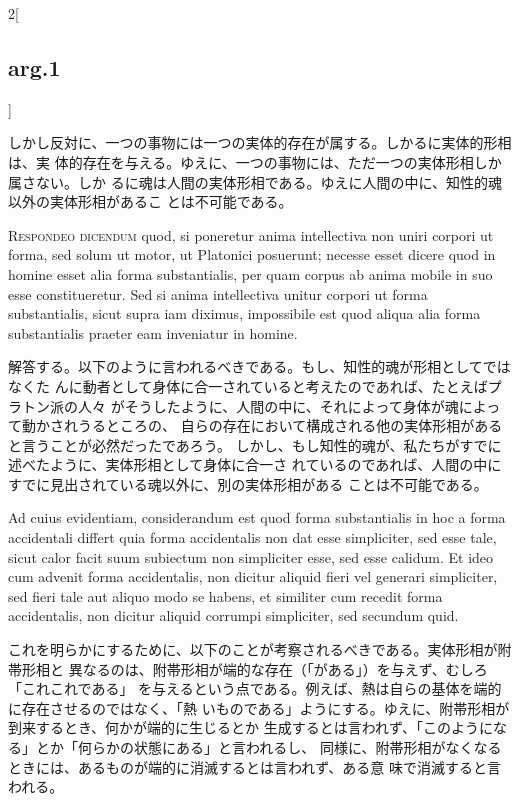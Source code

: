 \documentclass[paper=a4paper,fontsize=10pt,jafontsize=9pt,titlepage]{jlreq}
\begin{document}
\begin{paracol}{2}[\subsection{arg.1}]
\switchcolumn

 しかし反対に、一つの事物には一つの実体的存在が属する。しかるに実体的形相は、実
 体的存在を与える。ゆえに、一つの事物には、ただ一つの実体形相しか属さない。しか
 るに魂は人間の実体形相である。ゆえに人間の中に、知性的魂以外の実体形相があるこ
 とは不可能である。
 


{\scshape Respondeo dicendum} quod, si poneretur anima intellectiva non uniri
corpori ut forma, sed solum ut motor, ut Platonici posuerunt; necesse esset
dicere quod in homine esset alia forma substantialis, per quam corpus ab anima
mobile in suo esse constitueretur. Sed si anima intellectiva unitur corpori ut
forma substantialis, sicut supra iam diximus, impossibile est quod aliqua alia
forma substantialis praeter eam inveniatur in homine.

 \switchcolumn

 解答する。以下のように言われるべきである。もし、知性的魂が形相としてではなくた
 んに動者として身体に合一されていると考えたのであれば、たとえばプラトン派の人々
 がそうしたように、人間の中に、それによって身体が魂によって動かされうるところの、
 自らの存在において構成される他の実体形相があると言うことが必然だったであろう。
 しかし、もし知性的魂が、私たちがすでに述べたように、実体形相として身体に合一さ
 れているのであれば、人間の中にすでに見出されている魂以外に、別の実体形相がある
 ことは不可能である。
 
 
\switchcolumn*

Ad cuius evidentiam, considerandum est quod forma substantialis in hoc a forma
accidentali differt quia forma accidentalis non dat esse simpliciter, sed esse
tale, sicut calor facit suum subiectum non simpliciter esse, sed esse
calidum. Et ideo cum advenit forma accidentalis, non dicitur aliquid fieri vel
generari simpliciter, sed fieri tale aut aliquo modo se habens, et similiter cum
recedit forma accidentalis, non dicitur aliquid corrumpi simpliciter, sed
secundum quid.

\switchcolumn

これを明らかにするために、以下のことが考察されるべきである。実体形相が附帯形相と
異なるのは、附帯形相が端的な存在（「がある」）を与えず、むしろ「これこれである」
を与えるという点である。例えば、熱は自らの基体を端的に存在させるのではなく、「熱
いものである」ようにする。ゆえに、附帯形相が到来するとき、何かが端的に生じるとか
生成するとは言われず、「このようになる」とか「何らかの状態にある」と言われるし、
同様に、附帯形相がなくなるときには、あるものが端的に消滅するとは言われず、ある意
味で消滅すると言われる。
 

\end{paracol}
\end{document}
